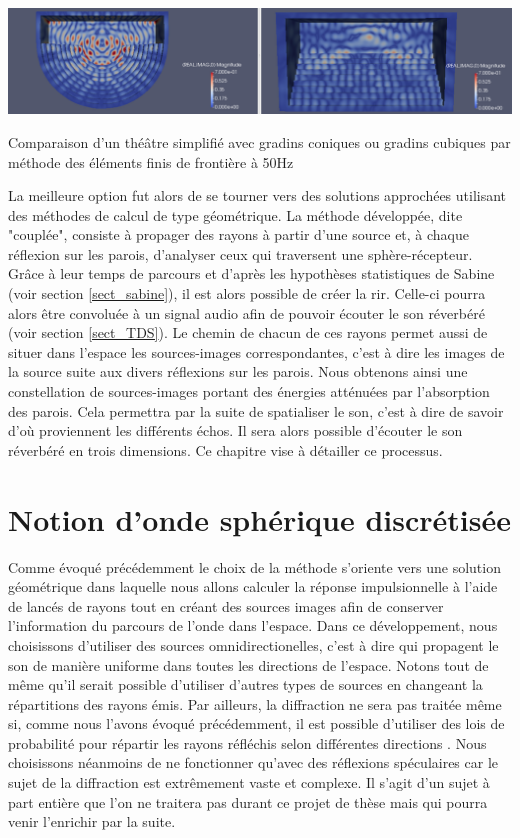 \begin{figureth}
	\includegraphics[width=\linewidth]{images/BEM}
	\caption{Comparaison d'un théâtre simplifié avec gradins coniques ou gradins cubiques par méthode des éléments finis de frontière à 50Hz}
	\label{BEM}
\end{figureth}

La meilleure option fut alors de se tourner vers des solutions approchées utilisant des méthodes de calcul de type géométrique. La méthode développée, dite "couplée", consiste à propager des rayons à partir d'une source et, à chaque réflexion sur les parois, d'analyser ceux qui traversent une sphère-récepteur. Grâce à leur temps de parcours et d'après les hypothèses statistiques de Sabine (voir section \ref{sect_sabine}), il est alors possible de créer la \gls{rir}. Celle-ci pourra alors être convoluée à un signal audio afin de pouvoir écouter le son réverbéré (voir section \ref{sect_TDS}). Le chemin de chacun de ces rayons permet aussi de situer dans l'espace les sources-images correspondantes, c'est à dire les images de la source suite aux divers réflexions sur les parois. Nous obtenons ainsi une constellation de sources-images portant des énergies atténuées par l'absorption des parois. Cela permettra par la suite de spatialiser le son, c'est à dire de savoir d'où proviennent les différents échos. Il sera alors possible d'écouter le son réverbéré en trois dimensions. Ce chapitre vise à détailler ce processus.

\section{Notion d'onde sphérique discrétisée} \label{sect_discretise}

Comme évoqué précédemment le choix de la méthode s'oriente vers une solution géométrique dans laquelle nous allons calculer la réponse impulsionnelle à l'aide de lancés de rayons tout en créant des sources images afin de conserver l'information du parcours de l'onde dans l'espace. Dans ce développement, nous choisissons d'utiliser des sources omnidirectionelles, c'est à dire qui propagent le son de manière uniforme dans toutes les directions de l'espace. Notons tout de même qu'il serait possible d'utiliser d'autres types de sources en changeant la répartitions des rayons émis. Par ailleurs, la diffraction ne sera pas traitée même si, comme nous l'avons évoqué précédemment, il est possible d'utiliser des lois de probabilité pour répartir les rayons réfléchis selon différentes directions \cite[p.187-199]{diffusion}. Nous choisissons néanmoins de ne fonctionner qu'avec des réflexions spéculaires car le sujet de la diffraction est extrêmement vaste et complexe. Il s'agit d'un sujet à part entière que l'on ne traitera pas durant ce projet de thèse mais qui pourra venir l'enrichir par la suite.

